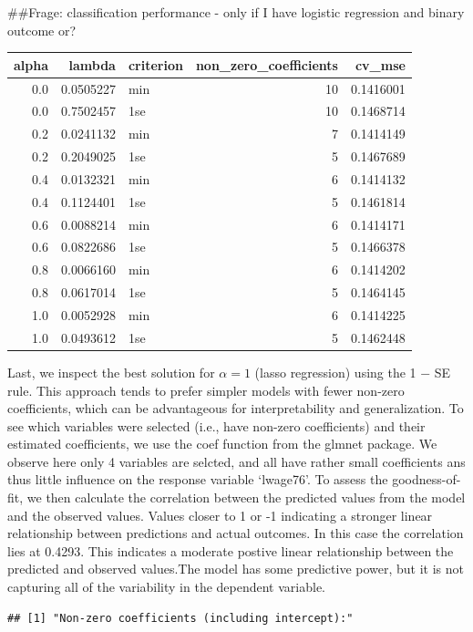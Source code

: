 \documentclass[
]{article}
\begin{document}
\#\#Frage: classification performance - only if I have logistic
regression and binary outcome or?

\begin{longtable}[]{@{}rrlrr@{}}
\toprule()
alpha & lambda & criterion & non\_zero\_coefficients & cv\_mse \\
\midrule()
\endhead
0.0 & 0.0505227 & min & 10 & 0.1416001 \\
0.0 & 0.7502457 & 1se & 10 & 0.1468714 \\
0.2 & 0.0241132 & min & 7 & 0.1414149 \\
0.2 & 0.2049025 & 1se & 5 & 0.1467689 \\
0.4 & 0.0132321 & min & 6 & 0.1414132 \\
0.4 & 0.1124401 & 1se & 5 & 0.1461814 \\
0.6 & 0.0088214 & min & 6 & 0.1414171 \\
0.6 & 0.0822686 & 1se & 5 & 0.1466378 \\
0.8 & 0.0066160 & min & 6 & 0.1414202 \\
0.8 & 0.0617014 & 1se & 5 & 0.1464145 \\
1.0 & 0.0052928 & min & 6 & 0.1414225 \\
1.0 & 0.0493612 & 1se & 5 & 0.1462448 \\
\bottomrule()
\end{longtable}

Last, we inspect the best solution for \(\alpha = 1\) (lasso regression)
using the 1 − SE rule. This approach tends to prefer simpler models with
fewer non-zero coefficients, which can be advantageous for
interpretability and generalization. To see which variables were
selected (i.e., have non-zero coefficients) and their estimated
coefficients, we use the coef function from the glmnet package. We
observe here only 4 variables are selcted, and all have rather small
coefficients ans thus little influence on the response variable
`lwage76'. To assess the goodness-of-fit, we then calculate the
correlation between the predicted values from the model and the observed
values. Values closer to 1 or -1 indicating a stronger linear
relationship between predictions and actual outcomes. In this case the
correlation lies at 0.4293. This indicates a moderate postive linear
relationship between the predicted and observed values.The model has
some predictive power, but it is not capturing all of the variability in
the dependent variable.

\begin{verbatim}
## [1] "Non-zero coefficients (including intercept):"
\end{verbatim}
\end{document}
